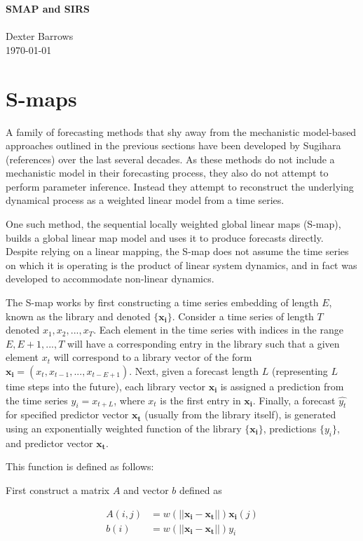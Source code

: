 \documentclass[12pt]{article}
\begin{document}
\noindent
{\LARGE {\bf SMAP and SIRS} }
\\\\
Dexter Barrows\\
\today

\section{S-maps}

    A family of forecasting methods that shy away from the mechanistic model-based approaches outlined in the previous sections have been developed by Sugihara (references) over the last several decades. As these methods do not include a mechanistic model in their forecasting process, they also do not attempt to perform parameter inference. Instead they attempt to reconstruct the underlying dynamical process as a weighted linear model from a time series.

    One such method, the sequential locally weighted global linear maps (S-map), builds a global linear map model and uses it to produce forecasts directly. Despite relying on a linear mapping, the S-map does not assume the time series on which it is operating is the product of linear system dynamics, and in fact was developed to accommodate non-linear dynamics.

    The S-map works by first constructing a time series embedding of length $E$, known as the library and denoted $\{\mathbf{x_i}\}$. Consider a time series of length $T$ denoted $x_1, x_2,..., x_T$. Each element in the time series with indices in the range $E,E+1,...,T$ will have a corresponding entry in the library such that a given element $x_t$ will correspond to a library vector of the form $\mathbf{x_i} = (x_t, x_{t-1},...,x_{t-E+1})$. Next, given a forecast length $L$ (representing $L$ time steps into the future), each library vector $\mathbf{x_i}$ is assigned a prediction from the time series $y_i = x_{t+L}$, where $x_t$ is the first entry in $\mathbf{x_i}$. Finally, a forecast ${\hat{y_t}}$ for specified predictor vector $\mathbf{x_t}$ (usually from the library itself), is generated using an exponentially weighted function of the library $\{\mathbf{x_i}\}$, predictions $\{y_i\}$, and predictor vector $\mathbf{x_t}$.

    This function is defined as follows:

    First construct a matrix $A$ and vector $b$ defined as

    \begin{equation}\label{AB}
    	\begin{array}{rl}
        \displaystyle
            A(i, j) & = w (||\mathbf{x_i}-\mathbf{x_t}||) \mathbf{x_i}(j) \\
            b(i) 	& = w (||\mathbf{x_i}-\mathbf{x_t}||) y_i
        \end{array}
    \end{equation}
\end{document}
